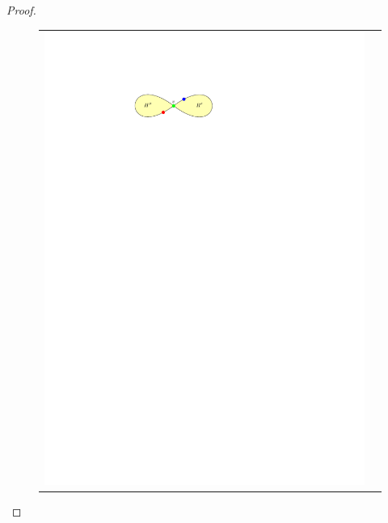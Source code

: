 \documentclass[12pt]{article}
\theoremstyle{definition}
\begin{document}
\begin{proof}
  \begin{figure}[htbp]
    \centering
    \begin{tabular}{cc}
      \includegraphics[page=1,trim={10 0 10 0},clip]{figs/critical_3_colouring} &

\end{tabular}
\end{figure}
\end{proof}
\end{document}
